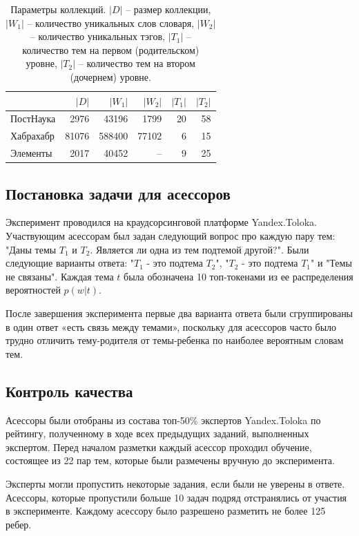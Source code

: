 \begin{table}[h!]
\centering
\begin{tabular}{l|r|r|r|r|r}
& $|D|$ & $|W_1|$ & $|W_2|$ & $|T_1|$ & $|T_2|$ \\
\hline
ПостНаука & 2976  & 43196  & 1799 & 20 & 58 \\
\hline
Хабрахабр & 81076 & 588400 & 77102 & 6 & 15 \\
\hline
Элементы & 2017  & 40452  & -- & 9 & 25 \\
\end{tabular}
\caption{\label{table:tm_datasets}Параметры коллекций. $|D|$ -- размер коллекции, $|W_1|$ -- количество уникальных слов словаря, $|W_2|$ -- количество уникальных тэгов, $|T_1|$ -- количество тем на первом (родительском) уровне, $|T_2|$ -- количество тем на втором (дочернем) уровне.}
\end{table}

\subsection{Постановка задачи для асессоров}

Эксперимент проводился на краудсорсинговой
платформе Yandex.Toloka. Участвующим асессорам был задан следующий вопрос про каждую пару тем: "Даны темы $T_1$ и $T_2$. Является ли одна из тем подтемой другой?". Были следующие варианты ответа: "$T_1$ - это подтема $T_2$", "$T_2$ - это подтема $T_1$" и "Темы не связаны". Каждая тема $t$ была обозначена 10 топ-токенами из ее распределения вероятностей $p(w|t)$.

После завершения эксперимента первые два варианта ответа были сгруппированы в один ответ «есть связь между темами», поскольку для асессоров часто было трудно отличить тему-родителя от темы-ребенка по наиболее вероятным словам тем. 

\subsection{Контроль качества}
Асессоры были отобраны из состава топ-50\% экспертов Yandex.Toloka по рейтингу, полученному в ходе всех предыдущих заданий, выполненных
экспертом. Перед началом разметки каждый асессор проходил обучение, состоящее из 22 пар тем, которые были размечены вручную до эксперимента.

Эксперты могли пропустить некоторые задания, если были не уверены в ответе. Асессоры, которые пропустили больше 10 задач подряд отстранялись от участия в эксперименте. Каждому асессору было разрешено разметить не более 125 ребер. 

